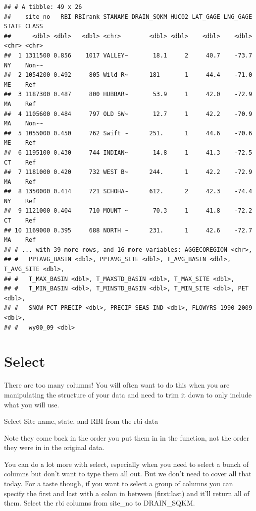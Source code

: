 \documentclass[
]{book}
\begin{document}
\begin{verbatim}
## # A tibble: 49 x 26
##    site_no   RBI RBIrank STANAME DRAIN_SQKM HUC02 LAT_GAGE LNG_GAGE STATE CLASS
##      <dbl> <dbl>   <dbl> <chr>        <dbl> <dbl>    <dbl>    <dbl> <chr> <chr>
##  1 1311500 0.856    1017 VALLEY~       18.1     2     40.7    -73.7 NY    Non-~
##  2 1054200 0.492     805 Wild R~      181       1     44.4    -71.0 ME    Ref  
##  3 1187300 0.487     800 HUBBAR~       53.9     1     42.0    -72.9 MA    Ref  
##  4 1105600 0.484     797 OLD SW~       12.7     1     42.2    -70.9 MA    Non-~
##  5 1055000 0.450     762 Swift ~      251.      1     44.6    -70.6 ME    Ref  
##  6 1195100 0.430     744 INDIAN~       14.8     1     41.3    -72.5 CT    Ref  
##  7 1181000 0.420     732 WEST B~      244.      1     42.2    -72.9 MA    Ref  
##  8 1350000 0.414     721 SCHOHA~      612.      2     42.3    -74.4 NY    Ref  
##  9 1121000 0.404     710 MOUNT ~       70.3     1     41.8    -72.2 CT    Ref  
## 10 1169000 0.395     688 NORTH ~      231.      1     42.6    -72.7 MA    Ref  
## # ... with 39 more rows, and 16 more variables: AGGECOREGION <chr>,
## #   PPTAVG_BASIN <dbl>, PPTAVG_SITE <dbl>, T_AVG_BASIN <dbl>, T_AVG_SITE <dbl>,
## #   T_MAX_BASIN <dbl>, T_MAXSTD_BASIN <dbl>, T_MAX_SITE <dbl>,
## #   T_MIN_BASIN <dbl>, T_MINSTD_BASIN <dbl>, T_MIN_SITE <dbl>, PET <dbl>,
## #   SNOW_PCT_PRECIP <dbl>, PRECIP_SEAS_IND <dbl>, FLOWYRS_1990_2009 <dbl>,
## #   wy00_09 <dbl>
\end{verbatim}

\hypertarget{select}{%
\section{Select}\label{select}}

There are too many columns! You will often want to do this when you are manipulating the structure of your data and need to trim it down to only include what you will use.

Select Site name, state, and RBI from the rbi data

Note they come back in the order you put them in in the function, not the order they were in in the original data.

You can do a lot more with select, especially when you need to select a bunch of columns but don't want to type them all out. But we don't need to cover all that today. For a taste though, if you want to select a group of columns you can specify the first and last with a colon in between (first:last) and it'll return all of them. Select the rbi columns from site\_no to DRAIN\_SQKM.
\end{document}
